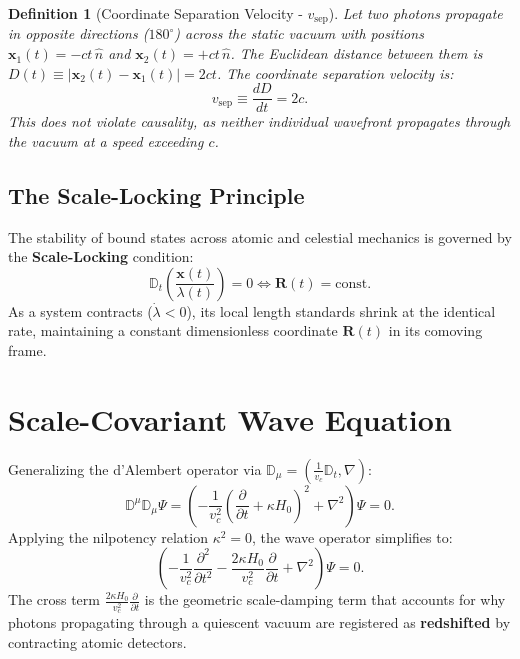 \documentclass[11pt,a4paper]{article}
\newtheorem{definition}{Definition}[section]
\begin{document}
\begin{definition}[Coordinate Separation Velocity - $v_{\mathrm{sep}}$]
    \label{def:koordinat_ayrilma_hizi_sc}
    Let two photons propagate in opposite directions ($180^\circ$) across the static vacuum with positions $\mathbf{x}_1(t) = -c t \, \hat{n}$ and $\mathbf{x}_2(t) = +c t \, \hat{n}$. The Euclidean distance between them is $D(t) \equiv |\mathbf{x}_2(t) - \mathbf{x}_1(t)| = 2ct$. The coordinate separation velocity is:
    \begin{equation}
        v_{\mathrm{sep}} \equiv \frac{d D}{dt} = 2c.
        \label{eq:ayrilma_hizi_2c}
    \end{equation}
    This does not violate causality, as neither individual wavefront propagates through the vacuum at a speed exceeding $c$.
\end{definition}

\subsection{The Scale-Locking Principle}
\label{sec:olceksel_kilitlenme}

The stability of bound states across atomic and celestial mechanics is governed by the \textbf{Scale-Locking} condition:
\begin{equation}
    \mathbb{D}_t \left( \frac{\mathbf{x}(t)}{\lambda(t)} \right) = 0 \iff \mathbf{R}(t) = \text{const}.
    \label{eq:scale_locking_tanim}
\end{equation}
As a system contracts ($\dot{\lambda} < 0$), its local length standards shrink at the identical rate, maintaining a constant dimensionless coordinate $\mathbf{R}(t)$ in its comoving frame.

\section{Scale-Covariant Wave Equation}
\label{sec:dalga_denklemi}

Generalizing the d'Alembert operator via $\mathbb{D}_\mu = (\frac{1}{v_c}\mathbb{D}_t, \nabla)$:
\begin{equation}
    \mathbb{D}^\mu \mathbb{D}_\mu \Psi = \left( -\frac{1}{v_c^2} \left(\frac{\partial}{\partial t} + \kappa H_0\right)^2 + \nabla^2 \right) \Psi = 0.
    \label{eq:genel_dalga_operatoru}
\end{equation}
Applying the nilpotency relation $\kappa^2 = 0$, the wave operator simplifies to:
\begin{equation}
    \left( -\frac{1}{v_c^2} \frac{\partial^2}{\partial t^2} - \frac{2\kappa H_0}{v_c^2} \frac{\partial}{\partial t} + \nabla^2 \right) \Psi = 0.
    \label{eq:acik_dalga}
\end{equation}
The cross term $\frac{2\kappa H_0}{v_c^2} \frac{\partial}{\partial t}$ is the geometric scale-damping term that accounts for why photons propagating through a quiescent vacuum are registered as \textbf{redshifted} by contracting atomic detectors.
\end{document}
